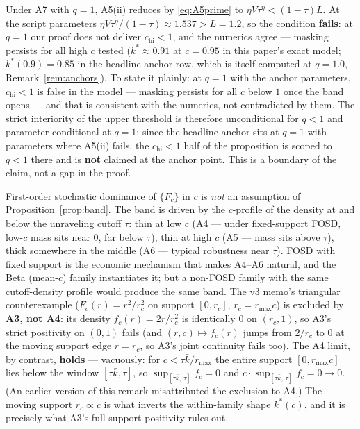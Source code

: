 \begin{remark}[The $q = 1$ upper edge]\label{rem:q1}
Under A7 with $q = 1$, A5(ii) reduces by \eqref{eq:A5prime} to
$\eta V \tau^{\eta} < (1 - \tau)L$. At the script parameters
$\eta V \tau^{\eta}/(1 - \tau) \approx 1.537 > L = 1.2$, so the condition
\textbf{fails}: at $q = 1$ our proof does not deliver $c_{\mathrm{hi}} < 1$, and the
numerics agree --- masking persists for all high $c$ tested ($k^* \approx 0.91$ at
$c = 0.95$ in this paper's exact model; $k^*(0.9) = 0.85$ in the headline anchor row,
which is itself computed at $q = 1.0$, Remark~\ref{rem:anchors}). To state it plainly:
at $q = 1$ with the anchor parameters, $c_{\mathrm{hi}} < 1$ is false in the model ---
masking persists for all $c$ below $1$ once the band opens --- and that is consistent
with the numerics, not contradicted by them. The strict interiority of the upper
threshold is therefore unconditional for $q < 1$ and parameter-conditional at $q = 1$;
since the headline anchor sits at $q = 1$ with parameters where A5(ii) fails, the
$c_{\mathrm{hi}} < 1$ half of the proposition is scoped to $q < 1$ there and is
\textbf{not} claimed at the anchor point. This is a boundary of the claim, not
a gap in the proof.
\end{remark}

\begin{remark}\label{rem:fosd}
First-order stochastic dominance of $\{F_c\}$ in $c$ is \emph{not} an assumption of
Proposition~\ref{prop:band}. The band is driven by the $c$-profile of the density at
and below the unraveling cutoff $\tau$: thin at low $c$ (A4 --- under fixed-support
FOSD, low-$c$ mass sits near $0$, far below $\tau$), thin at high $c$ (A5 --- mass sits
above $\tau$), thick somewhere in the middle (A6 --- typical robustness near $\tau$).
FOSD with fixed support is the economic mechanism that makes A4--A6 natural, and the
Beta (mean-$c$) family instantiates it; but a non-FOSD family with the same
cutoff-density profile would produce the same band. The v3 memo's triangular
counterexample ($F_c(r) = r^2/r_c^2$ on support $[0, r_c]$, $r_c = r_{\max} c$) is
excluded by \textbf{A3, not A4}: its density $f_c(r) = 2r/r_c^2$ is identically $0$ on
$(r_c, 1)$, so A3's strict positivity on $(0,1)$ fails (and $(r, c) \mapsto f_c(r)$
jumps from $2/r_c$ to $0$ at the moving support edge $r = r_c$, so A3's joint
continuity fails too). The A4 limit, by contrast, \textbf{holds} --- vacuously: for
$c < \tau\bar k/r_{\max}$ the entire support $[0, r_{\max} c]$ lies below the window
$[\tau\bar k, \tau]$, so $\sup_{[\tau\bar k,\, \tau]} f_c = 0$ and
$c \cdot \sup_{[\tau\bar k,\, \tau]} f_c = 0 \to 0$. (An earlier version of this remark
misattributed the exclusion to A4.) The moving support $r_c \propto c$ is what inverts
the within-family shape $k^*(c)$, and it is precisely what A3's full-support positivity
rules out.
\end{remark}


